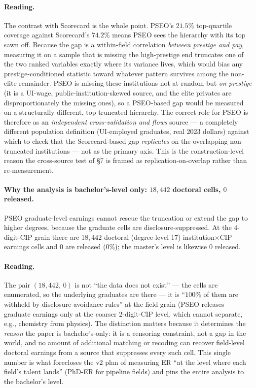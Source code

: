 \documentclass[11pt]{article}
\begin{document}
\paragraph{Reading.} The contrast with Scorecard is the whole point. PSEO's $21.5\%$ top-quartile coverage against Scorecard's $74.2\%$ means PSEO sees the hierarchy with its top sawn off. Because the gap is a within-field correlation \emph{between prestige and pay}, measuring it on a sample that is missing the high-prestige end truncates one of the two ranked variables exactly where its variance lives, which would bias any prestige-conditioned statistic toward whatever pattern survives among the non-elite remainder. PSEO is missing these institutions not at random but \emph{on prestige} (it is a UI-wage, public-institution-skewed source, and the elite privates are disproportionately the missing ones), so a PSEO-based gap would be measured on a structurally different, top-truncated hierarchy. The correct role for PSEO is therefore as an \emph{independent cross-validation and flows} source --- a completely different population definition (UI-employed graduates, real 2023 dollars) against which to check that the Scorecard-based gap \emph{replicates} on the overlapping non-truncated institutions --- not as the primary axis. This is the construction-level reason the cross-source test of \S7 is framed as replication-on-overlap rather than re-measurement.

\paragraph{Why the analysis is bachelor's-level only: $18{,}442$ doctoral cells, $0$ released.} PSEO graduate-level earnings cannot rescue the truncation or extend the gap to higher degrees, because the graduate cells are disclosure-suppressed. At the $4$-digit-CIP grain there are $18{,}442$ doctoral (degree-level $17$) institution$\times$CIP earnings cells and $0$ are released ($0\%$); the master's level is likewise $0$ released.
\paragraph{Reading.} The pair $(18{,}442,\,0)$ is not ``the data does not exist'' --- the cells are enumerated, so the underlying graduates are there --- it is ``$100\%$ of them are withheld by disclosure-avoidance rules'' at the field grain (PSEO releases graduate earnings only at the coarser $2$-digit-CIP level, which cannot separate, e.g., chemistry from physics). The distinction matters because it determines the \emph{reason} the paper is bachelor's-only: it is a censoring constraint, not a gap in the world, and no amount of additional matching or recoding can recover field-level doctoral earnings from a source that suppresses every such cell. This single number is what forecloses the v2 plan of measuring ER ``at the level where each field's talent lands'' (PhD-ER for pipeline fields) and pins the entire analysis to the bachelor's level.
\end{document}
